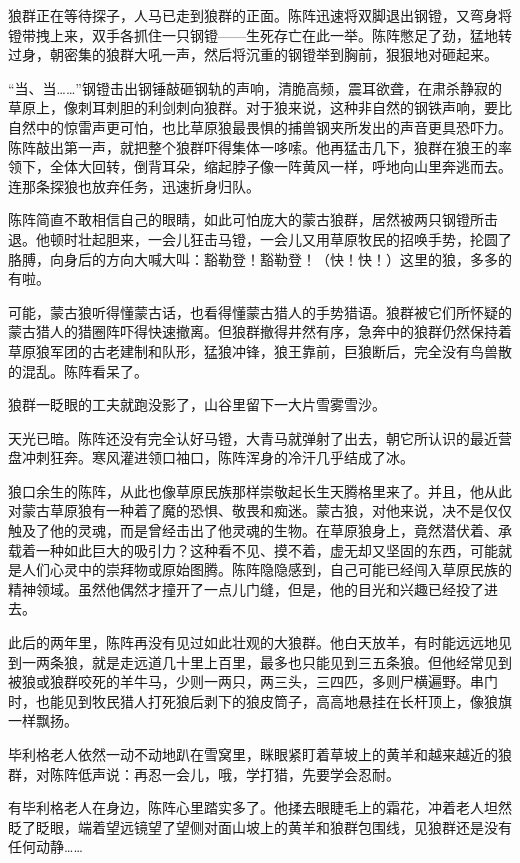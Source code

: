 \par 狼群正在等待探子，人马已走到狼群的正面。陈阵迅速将双脚退出钢镫，又弯身将镫带拽上来，双手各抓住一只钢镫——生死存亡在此一举。陈阵憋足了劲，猛地转过身，朝密集的狼群大吼一声，然后将沉重的钢镫举到胸前，狠狠地对砸起来。
\par “当、当……”钢镫击出钢锤敲砸钢轨的声响，清脆高频，震耳欲聋，在肃杀静寂的草原上，像刺耳刺胆的利剑刺向狼群。对于狼来说，这种非自然的钢铁声响，要比自然中的惊雷声更可怕，也比草原狼最畏惧的捕兽钢夹所发出的声音更具恐吓力。陈阵敲出第一声，就把整个狼群吓得集体一哆嗦。他再猛击几下，狼群在狼王的率领下，全体大回转，倒背耳朵，缩起脖子像一阵黄风一样，呼地向山里奔逃而去。连那条探狼也放弃任务，迅速折身归队。
\par 陈阵简直不敢相信自己的眼睛，如此可怕庞大的蒙古狼群，居然被两只钢镫所击退。他顿时壮起胆来，一会儿狂击马镫，一会儿又用草原牧民的招唤手势，抡圆了胳膊，向身后的方向大喊大叫：豁勒登！豁勒登！（快！快！）这里的狼，多多的有啦。
\par 可能，蒙古狼听得懂蒙古话，也看得懂蒙古猎人的手势猎语。狼群被它们所怀疑的蒙古猎人的猎圈阵吓得快速撤离。但狼群撤得井然有序，急奔中的狼群仍然保持着草原狼军团的古老建制和队形，猛狼冲锋，狼王靠前，巨狼断后，完全没有鸟兽散的混乱。陈阵看呆了。
\par 狼群一眨眼的工夫就跑没影了，山谷里留下一大片雪雾雪沙。
\par 天光已暗。陈阵还没有完全认好马镫，大青马就弹射了出去，朝它所认识的最近营盘冲刺狂奔。寒风灌进领口袖口，陈阵浑身的冷汗几乎结成了冰。
\par 狼口余生的陈阵，从此也像草原民族那样崇敬起长生天腾格里来了。并且，他从此对蒙古草原狼有一种着了魔的恐惧、敬畏和痴迷。蒙古狼，对他来说，决不是仅仅触及了他的灵魂，而是曾经击出了他灵魂的生物。在草原狼身上，竟然潜伏着、承载着一种如此巨大的吸引力？这种看不见、摸不着，虚无却又坚固的东西，可能就是人们心灵中的崇拜物或原始图腾。陈阵隐隐感到，自己可能已经闯入草原民族的精神领域。虽然他偶然才撞开了一点儿门缝，但是，他的目光和兴趣已经投了进去。
\par 此后的两年里，陈阵再没有见过如此壮观的大狼群。他白天放羊，有时能远远地见到一两条狼，就是走远道几十里上百里，最多也只能见到三五条狼。但他经常见到被狼或狼群咬死的羊牛马，少则一两只，两三头，三四匹，多则尸横遍野。串门时，也能见到牧民猎人打死狼后剥下的狼皮筒子，高高地悬挂在长杆顶上，像狼旗一样飘扬。
\par 
\par 毕利格老人依然一动不动地趴在雪窝里，眯眼紧盯着草坡上的黄羊和越来越近的狼群，对陈阵低声说：再忍一会儿，哦，学打猎，先要学会忍耐。
\par 有毕利格老人在身边，陈阵心里踏实多了。他揉去眼睫毛上的霜花，冲着老人坦然眨了眨眼，端着望远镜望了望侧对面山坡上的黄羊和狼群包围线，见狼群还是没有任何动静……
